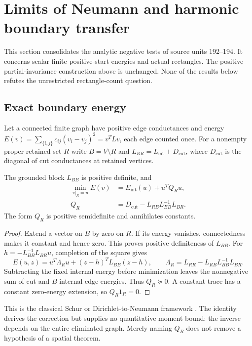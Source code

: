 \section{Limits of Neumann and harmonic boundary transfer}
\label{sec:boundary195}
This section consolidates the analytic negative tests of source units
192--194. It concerns scalar finite positive-start energies and actual
rectangles. The positive partial-invariance construction above is unchanged.
None of the results below refutes the unrestricted rectangle-count question.

\subsection{Exact boundary energy}
Let a connected finite graph have positive edge conductances and energy
$E(v)=\sum_{\{i,j\}}c_{ij}(v_i-v_j)^2=v^TLv$, each edge counted once.
For a nonempty proper retained set $R$ write $B=V\setminus R$ and
$L_{RR}=L_{\mathrm{int}}+D_{\mathrm{cut}}$, where $D_{\mathrm{cut}}$ is
the diagonal of cut conductances at retained vertices.
\begin{proposition}\label{prop:boundary195-schur}
The grounded block $L_{BB}$ is positive definite, and
\begin{align*}
 \min_{v|_R=u}E(v)&=E_{\mathrm{int}}(u)+u^TQ_Ru,\\
 Q_R&=D_{\mathrm{cut}}-L_{RB}L_{BB}^{-1}L_{BR}.
\end{align*}
The form $Q_R$ is positive semidefinite and annihilates constants.
\end{proposition}
\begin{proof}
Extend a vector on $B$ by zero on $R$. If its energy vanishes,
connectedness makes it constant and hence zero. This proves positive
definiteness of $L_{BB}$. For $h=-L_{BB}^{-1}L_{BR}u$, completion of the
square gives
\[
 E(u,z)=u^T\Lambda_Ru+(z-h)^TL_{BB}(z-h),\qquad
 \Lambda_R=L_{RR}-L_{RB}L_{BB}^{-1}L_{BR}.
\]
Subtracting the fixed internal energy before minimization leaves the
nonnegative sum of cut and $B$-internal edge energies. Thus $Q_R\succeq0$.
A constant trace has a constant zero-energy extension, so $Q_R1_R=0$.
\end{proof}
This is the classical Schur or Dirichlet-to-Neumann framework
\cite{bd:kron}. The identity derives the correction but supplies no
quantitative moment bound: the inverse depends on the entire eliminated
graph. Merely naming $Q_R$ does not remove a hypothesis of a spatial theorem.

